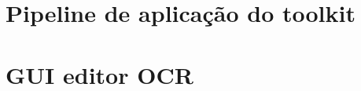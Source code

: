 




\section{Pipeline de aplicação do toolkit}
\label{contribution_toolkit_pipeline}






\section{GUI editor OCR}
\label{contribution_ocr_editor}







